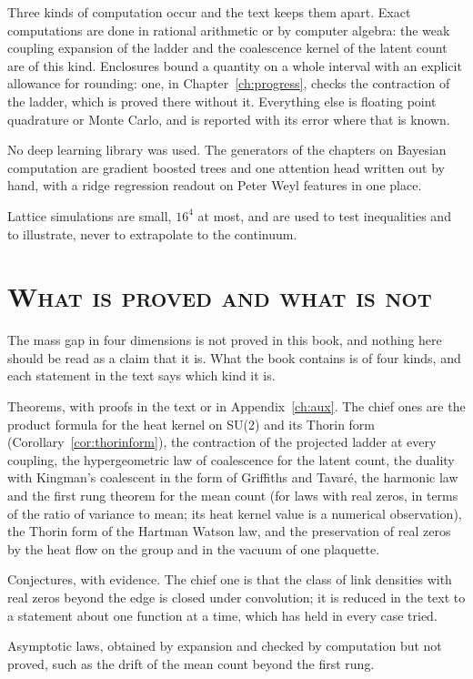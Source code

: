 \documentclass[11pt,twoside,openany]{book}
\theoremstyle{plainsc}
\theoremstyle{defsc}
\begin{document}
Three kinds of computation occur and the text keeps them apart. Exact computations are done in rational arithmetic or by computer algebra: the weak coupling expansion of the ladder and the coalescence kernel of the latent count are of this kind. Enclosures bound a quantity on a whole interval with an explicit allowance for rounding: one, in Chapter~\ref{ch:progress}, checks the contraction of the ladder, which is proved there without it. Everything else is floating point quadrature or Monte Carlo, and is reported with its error where that is known.

No deep learning library was used. The generators of the chapters on Bayesian computation are gradient boosted trees and one attention head written out by hand, with a ridge regression readout on Peter Weyl features in one place.

Lattice simulations are small, $16^4$ at most, and are used to test inequalities and to illustrate, never to extrapolate to the continuum.
\clearpage
\thispagestyle{plain}
\section*{\normalfont\large\scshape What is proved and what is not}
The mass gap in four dimensions is not proved in this book, and nothing here should be read as a claim that it is. What the book contains is of four kinds, and each statement in the text says which kind it is.

Theorems, with proofs in the text or in Appendix~\ref{ch:aux}. The chief ones are the product formula for the heat kernel on SU(2) and its Thorin form (Corollary~\ref{cor:thorinform}), the contraction of the projected ladder at every coupling, the hypergeometric law of coalescence for the latent count, the duality with Kingman's coalescent in the form of Griffiths and Tavar\'e, the harmonic law and the first rung theorem for the mean count (for laws with real zeros, in terms of the ratio of variance to mean; its heat kernel value is a numerical observation), the Thorin form of the Hartman Watson law, and the preservation of real zeros by the heat flow on the group and in the vacuum of one plaquette.

Conjectures, with evidence. The chief one is that the class of link densities with real zeros beyond the edge is closed under convolution; it is reduced in the text to a statement about one function at a time, which has held in every case tried.

Asymptotic laws, obtained by expansion and checked by computation but not proved, such as the drift of the mean count beyond the first rung.
\end{document}
